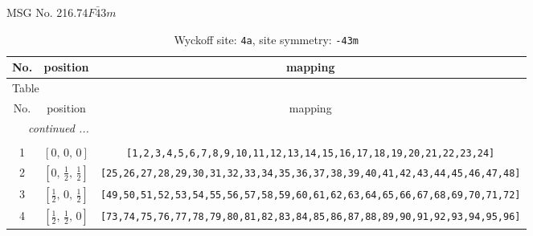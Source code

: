 \documentclass[fleqn,8pt]{jsarticle}
\begin{document}
\setcounter{MaxMatrixCols}{32}

\renewcommand{\tablename}{Table~}
\renewcommand{\figurename}{Figure~}
\begin{center}
\LARGE
MSG No. 216.74\quad$F\bar{4}3m$
\end{center}
\renewcommand{\arraystretch}{1.2}
\begin{longtable}{ccc}
\caption{Wyckoff site: {\tt 4a}, site symmetry: {\tt -43m}}
 \\
 \hline \hline
No. & position & mapping \\ \hline \endfirsthead

\multicolumn{2}{l}{\tablename\ \thetable{}} \\
 \hline \hline
No. & position & mapping \\ \hline \endhead

 \hline \hline
\multicolumn{2}{r}{\footnotesize\it continued ...} \\ \endfoot

 \hline \hline
\multicolumn{2}{r}{} \\ \endlastfoot

1 & $\left[ 0,\, 0,\, 0 \right]$ & {\tt [1,2,3,4,5,6,7,8,9,10,11,12,13,14,15,16,17,18,19,20,21,22,23,24]} \\ \hline
2 & $\left[ 0,\, \frac{1}{2},\, \frac{1}{2} \right]$ & {\tt [25,26,27,28,29,30,31,32,33,34,35,36,37,38,39,40,41,42,43,44,45,46,47,48]} \\ \hline
3 & $\left[ \frac{1}{2},\, 0,\, \frac{1}{2} \right]$ & {\tt [49,50,51,52,53,54,55,56,57,58,59,60,61,62,63,64,65,66,67,68,69,70,71,72]} \\ \hline
4 & $\left[ \frac{1}{2},\, \frac{1}{2},\, 0 \right]$ & {\tt [73,74,75,76,77,78,79,80,81,82,83,84,85,86,87,88,89,90,91,92,93,94,95,96]} \\
\end{longtable}
\renewcommand{\arraystretch}{1.2}
\end{document}
